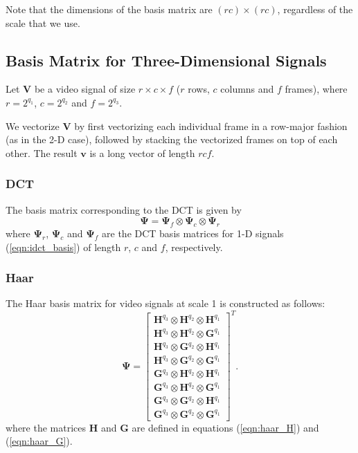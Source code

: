 Note that the dimensions of the basis matrix are $(rc)\times (rc)$, regardless of the scale that we use.

\subsection{Basis Matrix for Three-Dimensional Signals}

Let $\bm V$ be a video signal of size $r\times c\times f$ ($r$ rows, $c$ columns and $f$ frames), where $r=2^{q_1}$, $c=2^{q_2}$ and $f=2^{q_3}$.

We vectorize $\bm V$ by first vectorizing each individual frame in a row-major fashion (as in the 2-D case), followed by stacking the vectorized frames on top of each other.
The result $\bm v$ is a long vector of length $rcf$.

\subsubsection{DCT}
The basis matrix corresponding to the DCT is given by 
\begin{equation*}
  \bm\Psi = \bm\Psi_f\otimes\bm\Psi_c\otimes\bm\Psi_r
\end{equation*}
where $\bm\Psi_r$, $\bm\Psi_c$ and $\bm\Psi_f$ are the DCT basis matrices for 1-D signals (\ref{eqn:idct_basis}) of length $r$, $c$ and $f$, respectively.

\subsubsection{Haar}
The Haar basis matrix for video signals at scale 1 is constructed as follows:
\begin{equation*}
  \bm\Psi = 
  \begin{bmatrix}
    \bm H^{q_3}\otimes \bm H^{q_2} \otimes\bm H^{q_1} \\
    \bm H^{q_3}\otimes \bm H^{q_2} \otimes \bm G^{q_1} \\
    \bm H^{q_3}\otimes \bm G^{q_2} \otimes \bm H^{q_1} \\
    \bm H^{q_3}\otimes \bm G^{q_2} \otimes \bm G^{q_1} \\
    \bm G^{q_3}\otimes \bm H^{q_2} \otimes\bm H^{q_1} \\
    \bm G^{q_3}\otimes \bm H^{q_2} \otimes \bm G^{q_1} \\
    \bm G^{q_3}\otimes \bm G^{q_2} \otimes \bm H^{q_1} \\
    \bm G^{q_3}\otimes \bm G^{q_2} \otimes \bm G^{q_1} 
  \end{bmatrix}^T.
\end{equation*}
where the matrices $\bm H$ and $\bm G$ are defined in equations (\ref{eqn:haar_H}) and (\ref{eqn:haar_G}).

